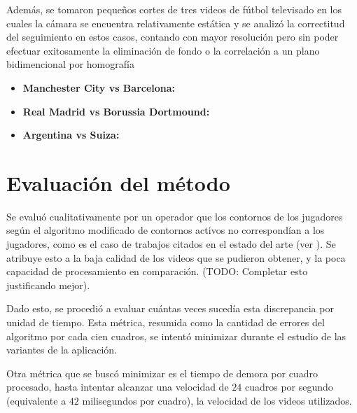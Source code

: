 Además, se tomaron pequeños cortes de tres videos de fútbol televisado en los cuales la cámara se encuentra relativamente estática y se analizó la correctitud del seguimiento en estos casos, contando con mayor resolución pero sin poder efectuar exitosamente la eliminación de fondo o la correlación a un plano bidimencional por homografía %

\begin{itemize}
  \item \textbf{Manchester City vs Barcelona:}
  \item \textbf{Real Madrid vs Borussia Dortmound:}
  \item \textbf{Argentina vs Suiza:}
\end{itemize}

\section{Evaluación del método}

Se evaluó cualitativamente por un operador que los contornos de los jugadores según el algoritmo modificado de contornos activos no correspondían a los jugadores, como es el caso de trabajos citados en el estado del arte (ver \cite{papers-tanos}). Se atribuye esto a la baja calidad de los videos que se pudieron obtener, y la poca capacidad de procesamiento en comparación. (TODO: Completar esto justificando mejor).

Dado esto, se procedió a evaluar cuántas veces sucedía esta discrepancia por unidad de tiempo. Esta métrica, resumida como la cantidad de errores del algoritmo por cada cien cuadros, se intentó minimizar durante el estudio de las variantes de la aplicación.

Otra métrica que se buscó minimizar es el tiempo de demora por cuadro procesado, hasta intentar alcanzar una velocidad de $24$ cuadros por segundo (equivalente a $42$ milisegundos por cuadro), la velocidad de los videos utilizados.


